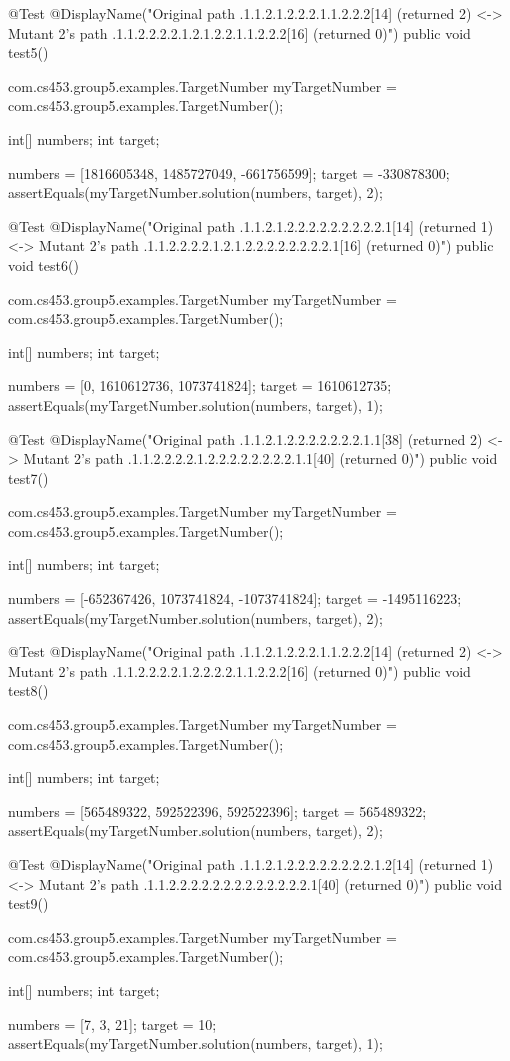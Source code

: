 @Test
@DisplayName("Original path .1.1.2.1.2.2.2.1.1.2.2.2[14] (returned 2) <-> Mutant 2's path .1.1.2.2.2.2.1.2.1.2.2.1.1.2.2.2[16] (returned 0)")
public void test5() {
    com.cs453.group5.examples.TargetNumber myTargetNumber = com.cs453.group5.examples.TargetNumber();

    int[] numbers;
    int target;

    numbers = [1816605348, 1485727049, -661756599];
    target = -330878300;
    assertEquals(myTargetNumber.solution(numbers, target), 2);
}

@Test
@DisplayName("Original path .1.1.2.1.2.2.2.2.2.2.2.2.2.1[14] (returned 1) <-> Mutant 2's path .1.1.2.2.2.2.1.2.1.2.2.2.2.2.2.2.2.1[16] (returned 0)")
public void test6() {
    com.cs453.group5.examples.TargetNumber myTargetNumber = com.cs453.group5.examples.TargetNumber();

    int[] numbers;
    int target;

    numbers = [0, 1610612736, 1073741824];
    target = 1610612735;
    assertEquals(myTargetNumber.solution(numbers, target), 1);
}

@Test
@DisplayName("Original path .1.1.2.1.2.2.2.2.2.2.2.1.1[38] (returned 2) <-> Mutant 2's path .1.1.2.2.2.2.1.2.2.2.2.2.2.2.2.1.1[40] (returned 0)")
public void test7() {
    com.cs453.group5.examples.TargetNumber myTargetNumber = com.cs453.group5.examples.TargetNumber();

    int[] numbers;
    int target;

    numbers = [-652367426, 1073741824, -1073741824];
    target = -1495116223;
    assertEquals(myTargetNumber.solution(numbers, target), 2);
}

@Test
@DisplayName("Original path .1.1.2.1.2.2.2.1.1.2.2.2[14] (returned 2) <-> Mutant 2's path .1.1.2.2.2.2.1.2.2.2.2.1.1.2.2.2[16] (returned 0)")
public void test8() {
    com.cs453.group5.examples.TargetNumber myTargetNumber = com.cs453.group5.examples.TargetNumber();

    int[] numbers;
    int target;

    numbers = [565489322, 592522396, 592522396];
    target = 565489322;
    assertEquals(myTargetNumber.solution(numbers, target), 2);
}

@Test
@DisplayName("Original path .1.1.2.1.2.2.2.2.2.2.2.2.1.2[14] (returned 1) <-> Mutant 2's path .1.1.2.2.2.2.2.2.2.2.2.2.2.2.2.1[40] (returned 0)")
public void test9() {
    com.cs453.group5.examples.TargetNumber myTargetNumber = com.cs453.group5.examples.TargetNumber();

    int[] numbers;
    int target;

    numbers = [7, 3, 21];
    target = 10;
    assertEquals(myTargetNumber.solution(numbers, target), 1);
}

